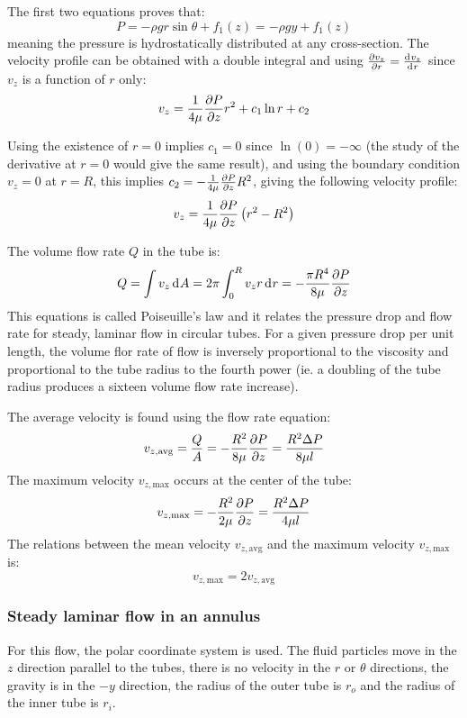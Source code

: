 \documentclass[10pt, twocolumn]{article}
\begin{document}
The first two equations proves that:
\[
  P = -\rho g r \sin\theta + f_1(z) = -\rho g y + f_1(z)
\]
meaning the pressure is hydrostatically distributed at any cross-section.
The velocity profile can be obtained with a double integral and using \(\frac{\partial v_z}{\partial r} = \frac{\mathrm{d}^{} v_z}{\mathrm{d}^{} r}\) since \(v_z\) is a function of \(r\) only:
\[
  v_z = \frac{1}{4\mu} \frac{\partial P}{\partial z} r^2 + c_1 \ln{r} + c_2
\]

Using the existence of \(r = 0\) implies \(c_1 = 0\) since \(\ln(0) = -\infty\) (the study of the derivative at \(r = 0\) would give the same result), and using the boundary condition \(v_z = 0\) at \(r = R\), this implies \(c_2 = -\frac{1}{4\mu} \frac{\partial P}{\partial z} R^2\), giving the following velocity profile:
\[
  v_z = \frac{1}{4\mu} \frac{\partial P}{\partial z} \left( r^2 - R^2 \right)
\]

The volume flow rate \(Q\) in the tube is:
\begin{align*}
  Q = \int{v_z \,\mathrm{d}^{} A} = 2\pi \int_0^R{v_z r \,\mathrm{d}^{} r} = -\frac{\pi R^4 }{8 \mu}\frac{\partial P}{\partial z}
\end{align*}
This equations is called Poiseuille's law and it relates the pressure drop and flow rate for steady, laminar flow in circular tubes.
For a given pressure drop per unit length, the volume flor rate of flow is inversely proportional to the viscosity and proportional to the tube radius to the fourth power (ie. a doubling of the tube radius produces a sixteen volume flow rate increase).

The average velocity is found using the flow rate equation:
\[
  v_{z,\mathrm{avg}} = \frac{Q}{A} = -\frac{R^2 }{8 \mu}\frac{\partial P}{\partial z} = \frac{R^2 \Delta P}{8\mu l}
\]
The maximum velocity \(v_{z,\mathrm{max}}\) occurs at the center of the tube:
\[
  v_{z,\mathrm{max}} = -\frac{R^2}{2\mu}\frac{\partial P}{\partial z} = \frac{R^2 \Delta P}{4\mu l}
\]
The relations between the mean velocity \(v_{z,\mathrm{avg}}\) and the maximum velocity \(v_{z,\mathrm{max}}\) is:
\[
  v_{z,\mathrm{max}} = 2 v_{z,\mathrm{avg}}
\]


\subsubsection{Steady laminar flow in an annulus}
For this flow, the polar coordinate system is used.
The fluid particles move in the \(z\) direction parallel to the tubes, there is no velocity in the \(r\) or \(\theta\) directions, the gravity is in the \(-y\) direction, the radius of the outer tube is \(r_o\) and the radius of the inner tube is \(r_i\).
\end{document}
